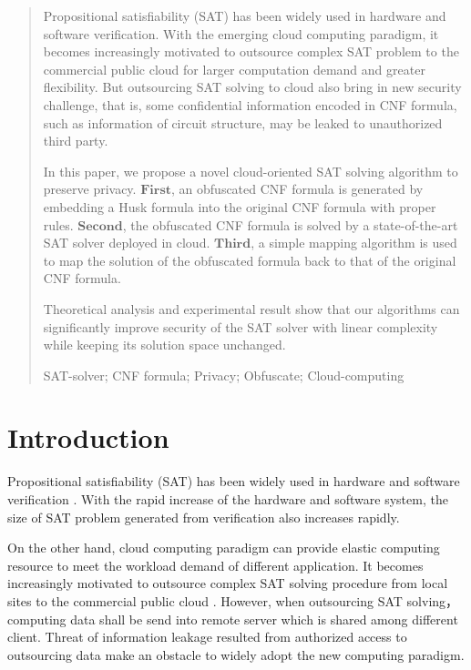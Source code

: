 \documentclass[runningheads,a4paper]{llncs}
\newcommand{\keywords}[1]{\par\addvspace\baselineskip
\noindent\keywordname\enspace\ignorespaces#1}
\begin{document}
\begin{abstract}

Propositional satisfiability (SAT) has been widely used in hardware and software verification. 
With the emerging cloud computing paradigm, 
it becomes increasingly motivated to outsource complex SAT problem to the commercial public cloud for larger computation demand and greater flexibility. 
But outsourcing SAT solving to cloud also bring in new security challenge, that is, some confidential information encoded in CNF formula, such as information of circuit structure, 
may be leaked to unauthorized third party.

In this paper, we propose a novel cloud-oriented SAT solving algorithm to preserve privacy.
$\mathbf{First}$, an obfuscated CNF formula is generated by embedding a Husk formula into the original CNF formula with proper rules.
$\mathbf{Second}$, the obfuscated CNF formula is solved by a state-of-the-art SAT solver deployed in cloud.
$\mathbf{Third}$, a simple mapping algorithm is used to map the solution of the obfuscated formula back to that of the original CNF formula. 

Theoretical analysis and experimental result show that our algorithms can significantly improve security of the SAT solver 
with linear complexity while keeping its solution space unchanged.


\keywords{SAT-solver; CNF formula; Privacy; Obfuscate; Cloud-computing}
\end{abstract}

\section{Introduction}
Propositional satisfiability \cite{t1} (SAT) has been widely used in hardware and software verification \cite{t2}\cite{t3}. With the rapid increase of the hardware and software system, the size of SAT problem generated from verification also increases rapidly. 

On the other hand, cloud computing paradigm can provide elastic computing resource to meet the workload demand of different application. It becomes increasingly motivated to outsource complex SAT solving procedure from local sites to the commercial public cloud \cite{t35}\cite{t37}. However, when outsourcing SAT solving，computing data shall be send into remote server which is shared among different client. Threat of information leakage resulted from authorized access to outsourcing data make an obstacle to widely adopt the new computing paradigm. 
\end{document}
